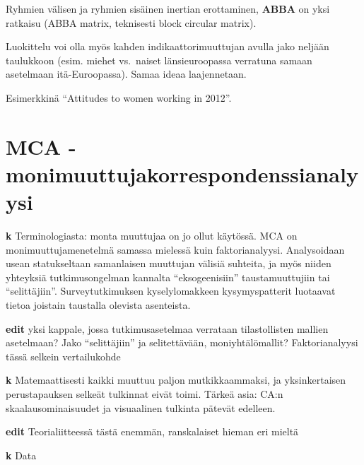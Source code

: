 \documentclass[
  finnish,
]{book}
\begin{document}
Ryhmien välisen ja ryhmien sisäinen inertian erottaminen, \textbf{ABBA}
on yksi ratkaisu (ABBA matrix, teknisesti block circular matrix).

Luokittelu voi olla myös kahden indikaattorimuuttujan avulla jako
neljään taulukkoon (esim. miehet vs.~naiset länsieuroopassa verratuna
samaan asetelmaan itä-Euroopassa). Samaa ideaa laajennetaan.

Esimerkkinä ``Attitudes to women working in 2012''.

\hypertarget{mca---monimuuttujakorrespondenssianalyysi}{%
\section{MCA -
monimuuttujakorrespondenssianalyysi}\label{mca---monimuuttujakorrespondenssianalyysi}}

\textbf{k} Terminologiasta: monta muuttujaa on jo ollut käytössä. MCA on
monimuuttujamenetelmä samassa mielessä kuin faktorianalyysi.
Analysoidaan usean statukseltaan samanlaisen muuttujan välisiä suhteita,
ja myös niiden yhteyksiä tutkimusongelman kannalta ``eksogeenisiin''
taustamuuttujiin tai ``selittäjiin''. Surveytutkimuksen kyselylomakkeen
kysymyspatterit luotaavat tietoa joistain taustalla olevista asenteista.

\textbf{edit} yksi kappale, jossa tutkimusasetelmaa verrataan
tilastollisten mallien asetelmaan? Jako ``selittäjiin'' ja
selitettävään, moniyhtälömallit? Faktorianalyysi tässä selkein
vertailukohde

\textbf{k} Matemaattisesti kaikki muuttuu paljon mutkikkaammaksi, ja
yksinkertaisen perustapauksen selkeät tulkinnat eivät toimi. Tärkeä
asia: CA:n skaalausominaisuudet ja visuaalinen tulkinta pätevät
edelleen.

\textbf{edit} Teorialiitteessä tästä enemmän, ranskalaiset hieman eri
mieltä

\textbf{k} Data
\end{document}
